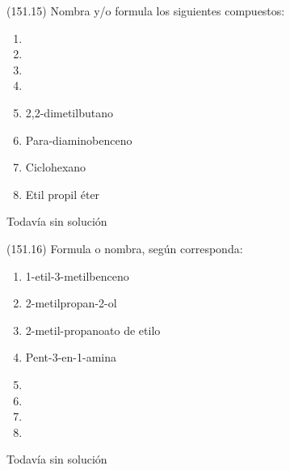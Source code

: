 \documentclass[10pt,a5paper,twoside]{article}
\begin{document}
  \begin{exercise}[
      tags    = {},
      topics  = {química, química orgánica, orgánica},
      source  = {FQ 1B MGH 2016, p151, e15},
    ]
    (151.15) Nombra y/o formula los siguientes compuestos:
    \begin{enumerate}
      \item {}
      \item {}
      \item {}
      \item {}
      \item 2,2-dimetilbutano
      \item Para-diaminobenceno
      \item Ciclohexano
      \item Etil propil éter
    \end{enumerate}
  \end{exercise}

  \begin{solution}[print=false]
    Todavía sin solución
  \end{solution}




  \begin{exercise}[
      tags    = {},
      topics  = {química, química orgánica, orgánica},
      source  = {FQ 1B MGH 2016, p151, e16},
    ]
    (151.16) Formula o nombra, según corresponda:
    \begin{enumerate}
      \item 1-etil-3-metilbenceno
      \item 2-metilpropan-2-ol
      \item 2-metil-propanoato de etilo
      \item Pent-3-en-1-amina
      \item {}
      \item {}
      \item {}
      \item {}
    \end{enumerate}
  \end{exercise}

  \begin{solution}[print=false]
    Todavía sin solución
  \end{solution}
\end{document}
